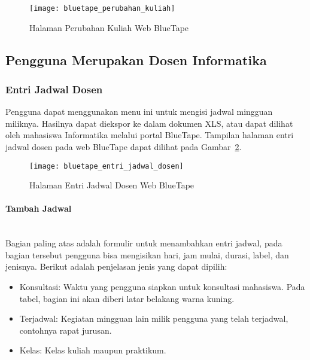 \begin{figure}[H]
    \centering  
    \texttt{[image: bluetape\_perubahan\_kuliah]}
    \caption[Halaman Perubahan Kuliah Web BlueTape]{Halaman Perubahan Kuliah Web BlueTape}
    \label{fig:bluetape_perubahan_kuliah}
\end{figure}

\subsection{Pengguna Merupakan Dosen Informatika}
\label{sec:bluetape_dosen_informatika}

\subsubsection{Entri Jadwal Dosen}
\label{sec:bluetape_entri_jadwal_dosen}
Pengguna dapat menggunakan menu ini untuk mengisi jadwal mingguan miliknya. Hasilnya dapat diekspor ke dalam dokumen XLS, atau dapat dilihat oleh mahasiswa Informatika melalui portal BlueTape. Tampilan halaman entri jadwal dosen pada web BlueTape dapat dilihat pada \mbox{Gambar \ref{fig:bluetape_entri_jadwal_dosen}}.

\begin{figure}[h]
    \centering  
    \texttt{[image: bluetape\_entri\_jadwal\_dosen]}
    \caption[Halaman Entri Jadwal Dosen Web BlueTape]{Halaman Entri Jadwal Dosen Web BlueTape}
    \label{fig:bluetape_entri_jadwal_dosen}
\end{figure}

\paragraph{Tambah Jadwal}
\label{sec:bluetape_tambah_jadwal}
\phantom{blank}\\

Bagian paling atas adalah formulir untuk menambahkan entri jadwal, pada bagian tersebut pengguna bisa mengisikan hari, jam mulai, durasi, label, dan jenisnya. Berikut adalah penjelasan jenis yang dapat dipilih:
\begin{itemize}
	\item Konsultasi: Waktu yang pengguna siapkan untuk konsultasi mahasiswa. Pada tabel, bagian ini akan diberi latar belakang warna kuning.
	\item Terjadwal: Kegiatan mingguan lain milik pengguna yang telah terjadwal, contohnya rapat jurusan.
	\item Kelas: Kelas kuliah maupun praktikum.
\end{itemize}

